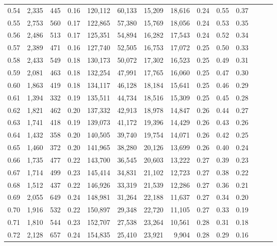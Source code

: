 \begin{tabular}{rrrrrrrrrrrrrr}
0.54 &  2,335 &  445 &  0.16 &  120,112 &   60,133 &  15,209 &  18,616 &  0.24 &  0.55 &      0.37 \\
0.55 &  2,753 &  560 &  0.17 &  122,865 &   57,380 &  15,769 &  18,056 &  0.24 &  0.53 &      0.35 \\
0.56 &  2,486 &  513 &  0.17 &  125,351 &   54,894 &  16,282 &  17,543 &  0.24 &  0.52 &      0.34 \\
0.57 &  2,389 &  471 &  0.16 &  127,740 &   52,505 &  16,753 &  17,072 &  0.25 &  0.50 &      0.33 \\
0.58 &  2,433 &  549 &  0.18 &  130,173 &   50,072 &  17,302 &  16,523 &  0.25 &  0.49 &      0.31 \\
0.59 &  2,081 &  463 &  0.18 &  132,254 &   47,991 &  17,765 &  16,060 &  0.25 &  0.47 &      0.30 \\
0.60 &  1,863 &  419 &  0.18 &  134,117 &   46,128 &  18,184 &  15,641 &  0.25 &  0.46 &      0.29 \\
0.61 &  1,394 &  332 &  0.19 &  135,511 &   44,734 &  18,516 &  15,309 &  0.25 &  0.45 &      0.28 \\
0.62 &  1,821 &  462 &  0.20 &  137,332 &   42,913 &  18,978 &  14,847 &  0.26 &  0.44 &      0.27 \\
0.63 &  1,741 &  418 &  0.19 &  139,073 &   41,172 &  19,396 &  14,429 &  0.26 &  0.43 &      0.26 \\
0.64 &  1,432 &  358 &  0.20 &  140,505 &   39,740 &  19,754 &  14,071 &  0.26 &  0.42 &      0.25 \\
0.65 &  1,460 &  372 &  0.20 &  141,965 &   38,280 &  20,126 &  13,699 &  0.26 &  0.40 &      0.24 \\
0.66 &  1,735 &  477 &  0.22 &  143,700 &   36,545 &  20,603 &  13,222 &  0.27 &  0.39 &      0.23 \\
0.67 &  1,714 &  499 &  0.23 &  145,414 &   34,831 &  21,102 &  12,723 &  0.27 &  0.38 &      0.22 \\
0.68 &  1,512 &  437 &  0.22 &  146,926 &   33,319 &  21,539 &  12,286 &  0.27 &  0.36 &      0.21 \\
0.69 &  2,055 &  649 &  0.24 &  148,981 &   31,264 &  22,188 &  11,637 &  0.27 &  0.34 &      0.20 \\
0.70 &  1,916 &  532 &  0.22 &  150,897 &   29,348 &  22,720 &  11,105 &  0.27 &  0.33 &      0.19 \\
0.71 &  1,810 &  544 &  0.23 &  152,707 &   27,538 &  23,264 &  10,561 &  0.28 &  0.31 &      0.18 \\
0.72 &  2,128 &  657 &  0.24 &  154,835 &   25,410 &  23,921 &   9,904 &  0.28 &  0.29 &      0.16 \\

\end{tabular}
